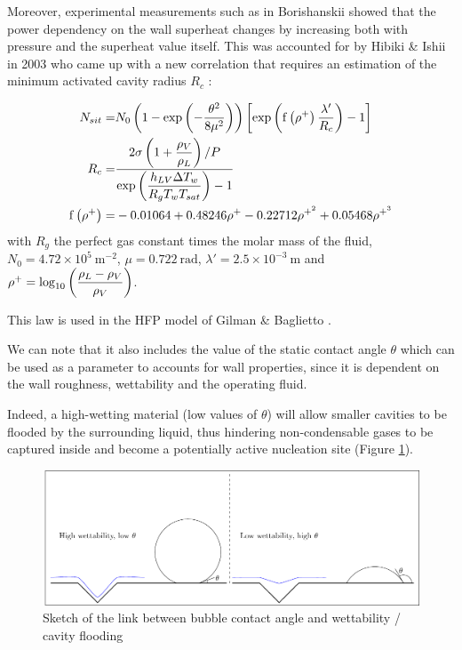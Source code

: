 \npar

Moreover, experimental measurements such as in Borishanskii \cite{borishanskii} showed that the power dependency on the wall superheat changes by increasing both with pressure and the superheat value itself. This was accounted for by Hibiki \& Ishii in 2003 \cite{hibiki_ishii} who came up with a new correlation that requires an estimation of the minimum activated cavity radius $R_{c}$ : 


\begin{align}
N_{sit} =& N_{0}\parth{1-\exp{-\dfrac{\theta^{2}}{8\mu^{2}} } }\crocht{\exp{ \mathrm{f}\parth{\rho^{+}}\dfrac{\lambda '}{R_{c}} } -1}
\label{eq:nsit_hibiki} \\
%
R_{c} =& \dfrac{2\sigma\parth{1+\dfrac{\rho_{V}}{\rho_{L}}} / P }{\exp{\dfrac{h_{LV} \Delta T_{w}}{R_{g}T_{w}T_{sat}} } -1}\\
%
\mathrm{f}\parth{\rho^{+}} =& -0.01064 + 0.48246\rho^{+} - 0.22712 \rho^{+^{2}} + 0.05468 \rho^{+^{3}}
\end{align}
with $R_{g}$ the perfect gas constant times the molar mass of the fluid,  $N_{0}=4.72\times 10^{5}\ \mathrm{m}^{-2}$, $\mu = 0.722\ \mathrm{rad}$, $\lambda ' = 2.5 \times 10^{-3} \ \mathrm{m}$ and $\rho^{+}=\mathrm{log}_{10}\left( \dfrac{\rho_{L}-\rho_{V}}{\rho_{V}} \right)$.


\begin{remark*}{}
This law is used in the HFP model of Gilman \& Baglietto \cite{gilman_baglietto}.
\end{remark*}

We can note that it also includes the value of the static contact angle $\theta$ which can be used as a parameter to accounts for wall properties, since it is dependent on the wall roughness, wettability and the operating fluid. 

Indeed, a high-wetting material (low values of $\theta$) will allow smaller cavities to be flooded by the surrounding liquid, thus hindering non-condensable gases to be captured inside and become a potentially active nucleation site (Figure \ref{fig:nsd_theta_wet}).

\begin{figure}[h!]
\centering
\includegraphics[scale=0.8]{img/NSD/wettability.pdf}
\caption{Sketch of the link between bubble contact angle and wettability / cavity flooding}
\label{fig:nsd_theta_wet}
\end{figure}


